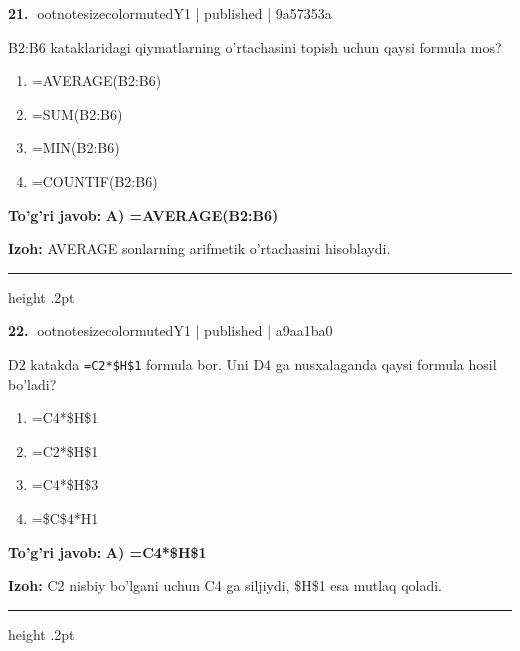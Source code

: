 \documentclass[10pt,a4paper]{article}
\begin{document}
\textbf{\color{ink}21.} {ootnotesizecolor{muted}Y1 | published | 9a57353a}
\par
B2:B6 kataklaridagi qiymatlarning o'rtachasini topish uchun qaysi formula mos?
\begin{enumerate}[label=\Alph*),leftmargin=9mm]
\item =AVERAGE(B2:B6)
\item =SUM(B2:B6)
\item =MIN(B2:B6)
\item =COUNTIF(B2:B6)
\end{enumerate}
\begin{tcolorbox}[enhanced,breakable,colback=teal!4,colframe=teal!55!black,boxrule=0.45pt,arc=1.2mm,left=2.8mm,right=2.8mm,top=2mm,bottom=2mm]
\textbf{\color{teal}To'g'ri javob:} \textbf{A) =AVERAGE(B2:B6)}
\par\smallskip
\textbf{Izoh:} AVERAGE sonlarning arifmetik o'rtachasini hisoblaydi.
\end{tcolorbox}
\vspace{2mm}\hrule height .2pt\vspace{2mm}

\textbf{\color{ink}22.} {ootnotesizecolor{muted}Y1 | published | a9aa1ba0}
\par
D2 katakda \texttt{=C2*\$H\$1} formula bor. Uni D4 ga nusxalaganda qaysi formula hosil bo'ladi?
\begin{enumerate}[label=\Alph*),leftmargin=9mm]
\item =C4*\$H\$1
\item =C2*\$H\$1
\item =C4*\$H\$3
\item =\$C\$4*H1
\end{enumerate}
\begin{tcolorbox}[enhanced,breakable,colback=teal!4,colframe=teal!55!black,boxrule=0.45pt,arc=1.2mm,left=2.8mm,right=2.8mm,top=2mm,bottom=2mm]
\textbf{\color{teal}To'g'ri javob:} \textbf{A) =C4*\$H\$1}
\par\smallskip
\textbf{Izoh:} C2 nisbiy bo'lgani uchun C4 ga siljiydi, \$H\$1 esa mutlaq qoladi.
\end{tcolorbox}
\vspace{2mm}\hrule height .2pt\vspace{2mm}
\end{document}
